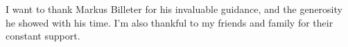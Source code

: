I want to thank Markus Billeter for his invaluable guidance, and the generosity he showed with his time. I'm also thankful to my friends and family for their constant support.